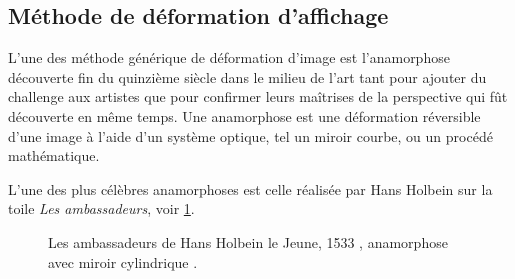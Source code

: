 \subsection{Méthode de déformation d'affichage}

L'une des méthode générique de déformation d'image est l'anamorphose découverte fin du quinzième siècle dans le milieu de l'art tant pour ajouter du challenge aux artistes que pour confirmer leurs maîtrises de la perspective qui fût découverte en même temps.
Une anamorphose est une déformation réversible d'une image à l'aide d'un système optique, tel un miroir courbe, ou un procédé mathématique.

L'une des plus célèbres anamorphoses est celle réalisée par Hans Holbein sur la toile \textit{Les ambassadeurs}, voir \ref{fig:ambassador}.

\begin{figure}[!ht]
    \centering
    \caption{Les ambassadeurs de Hans Holbein le Jeune, 1533 ,  anamorphose avec miroir cylindrique .}
	\label{fig:ambassador}
\end{figure}

